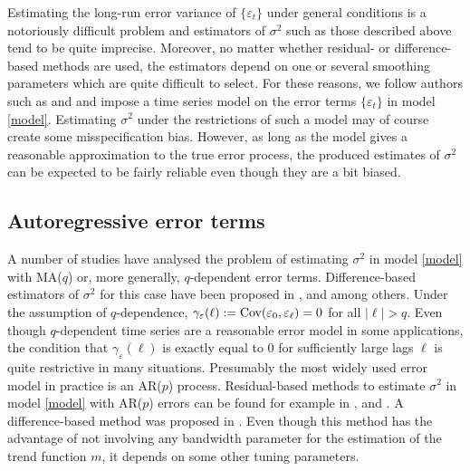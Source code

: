 Estimating the long-run error variance of $\{ \varepsilon_t \}$ under general conditions is a notoriously difficult problem and estimators of $\sigma^2$ such as those described above tend to be quite imprecise. Moreover, no matter whether residual- or difference-based methods are used, the estimators depend on one or several smoothing parameters which are quite difficult to select. For these reasons, we follow authors such as \cite{Hart1991, Hart1994} and \cite{Hall2003} and impose a time series model on the error terms $\{\varepsilon_t\}$ in model \eqref{model}. Estimating $\sigma^2$ under the restrictions of such a model may of course create some misspecification bias. However, as long as the model gives a reasonable approximation to the true error process, the produced estimates of $\sigma^2$ can be expected to be fairly reliable even though they are a bit biased. 


\subsection{Autoregressive error terms}\label{subsec-error-var-ar}


A number of studies have analysed the problem of estimating $\sigma^2$ in model \eqref{model} with MA($q$) or, more generally, $q$-dependent error terms. Difference-based estimators of $\sigma^2$ for this case have been proposed in \cite{MuellerStadtmueller1988}, \cite{Herrmann1992} and \cite{Munk2017} among others. Under the assumption of $q$-dependence, $\gamma_\varepsilon(\ell) := \textnormal{Cov}(\varepsilon_0,\varepsilon_{\ell}) = 0$ for all $|\ell| > q$. Even though $q$-dependent time series are a reasonable error model in some applications, the condition that $\gamma_\varepsilon(\ell)$ is exactly equal to $0$ for sufficiently large lags $\ell$ is quite restrictive in many situations. Presumably the most widely used error model in practice is an AR($p$) process. Residual-based methods to estimate $\sigma^2$ in model \eqref{model} with AR($p$) errors can be found for example in \cite{Truong1991}, \cite{ShaoYang2011} and \cite{QiuShaoYang2013}. A difference-based method was proposed in \cite{Hall2003}. Even though this method has the advantage of not involving any bandwidth parameter for the estimation of the trend function $m$, it depends on some other tuning parameters. 


